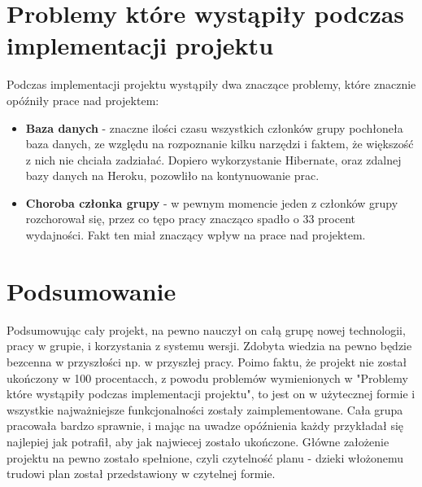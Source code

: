 \documentclass[a4paper,11pt]{uzreport}
\begin{document}
\section{Problemy które wystąpiły podczas implementacji projektu}
Podczas implementacji projektu wystąpiły dwa znaczące problemy, które znacznie opóźniły prace nad projektem: 
    \begin{itemize}[leftmargin=0.50in]
    
        \item \textbf{Baza danych} - znaczne ilości czasu wszystkich członków grupy pochłoneła baza danych, ze względu na rozpoznanie kilku narzędzi i faktem, że 	większość z nich nie chciała zadziałać. Dopiero wykorzystanie Hibernate, oraz zdalnej bazy danych na Heroku, pozowliło na kontynuowanie prac. 
        
        \item \textbf{Choroba członka grupy} - w pewnym momencie jeden z członków grupy rozchorował się, przez co tępo pracy znacząco spadło o 33 procent 			wydajności. Fakt ten miał znaczący wpływ na prace nad projektem.
        
    \end{itemize}

\section{Podsumowanie}
Podsumowując cały projekt, na pewno nauczył on całą grupę nowej technologii, pracy w grupie, i korzystania z systemu wersji. Zdobyta wiedzia na pewno będzie bezcenna w przyszłości np. w przyszłej pracy. Poimo faktu, że projekt nie został ukończony w 100 procentacch, z powodu problemów wymienionych w "Problemy które wystąpiły podczas implementacji projektu", to jest on w użytecznej formie i wszystkie najważniejsze funkcjonalności zostały zaimplementowane. Cała grupa pracowała bardzo sprawnie, i mając na uwadze opóźnienia każdy przykładał się najlepiej jak potrafił, aby jak najwiecej zostało ukończone. Główne założenie projektu na pewno zostało spełnione, czyli czytelność planu - dzieki włożonemu trudowi plan został przedstawiony w czytelnej formie. 
\end{document}
